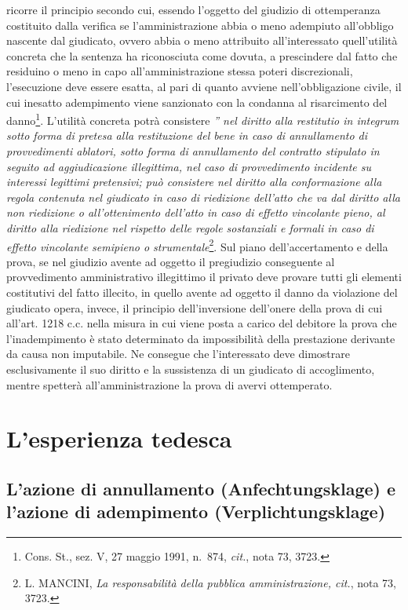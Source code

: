 \documentclass[12pt,it,a4paper,]{report}
\begin{document}
ricorre il principio secondo cui, essendo l'oggetto del giudizio di
ottemperanza costituito dalla verifica se l'amministrazione abbia o meno
adempiuto all'obbligo nascente dal giudicato, ovvero abbia o meno
attribuito all'interessato quell'utilità concreta che la sentenza ha
riconosciuta come dovuta, a prescindere dal fatto che residuino o meno
in capo all'amministrazione stessa poteri discrezionali, l'esecuzione
deve essere esatta, al pari di quanto avviene nell'obbligazione civile,
il cui inesatto adempimento viene sanzionato con la condanna al
risarcimento del danno\footnote{Cons. St., sez. V, 27 maggio 1991,
  n.~874, \emph{cit.}, nota 73, 3723.}. L'utilità concreta potrà
consistere \emph{'' nel diritto alla restitutio in integrum sotto forma
di pretesa alla restituzione del bene in caso di annullamento di
provvedimenti ablatori, sotto forma di annullamento del contratto
stipulato in seguito ad aggiudicazione illegittima, nel caso di
provvedimento incidente su interessi legittimi pretensivi; può
consistere nel diritto alla conformazione alla regola contenuta nel
giudicato in caso di riedizione dell'atto che va dal diritto alla non
riedizione o all'ottenimento dell'atto in caso di effetto vincolante
pieno, al diritto alla riedizione nel rispetto delle regole sostanziali
e formali in caso di effetto vincolante semipieno o
strumentale}\footnote{L. MANCINI, \emph{La responsabilità della pubblica
  amministrazione, cit.}, nota 73, 3723.}. Sul piano dell'accertamento e
della prova, se nel giudizio avente ad oggetto il pregiudizio
conseguente al provvedimento amministrativo illegittimo il privato deve
provare tutti gli elementi costitutivi del fatto illecito, in quello
avente ad oggetto il danno da violazione del giudicato opera, invece, il
principio dell'inversione dell'onere della prova di cui all'art. 1218
c.c. nella misura in cui viene posta a carico del debitore la prova che
l'inadempimento è stato determinato da impossibilità della prestazione
derivante da causa non imputabile. Ne consegue che l'interessato deve
dimostrare esclusivamente il suo diritto e la sussistenza di un
giudicato di accoglimento, mentre spetterà all'amministrazione la prova
di avervi ottemperato.

\hypertarget{lesperienza-tedesca}{%
\chapter{L'esperienza tedesca}\label{lesperienza-tedesca}}

\hypertarget{lazione-di-annullamento-anfechtungsklage-e-lazione-di-adempimento-verplichtungsklage}{%
\section{L'azione di annullamento (Anfechtungsklage) e l'azione di
adempimento
(Verplichtungsklage)}\label{lazione-di-annullamento-anfechtungsklage-e-lazione-di-adempimento-verplichtungsklage}}
\end{document}
